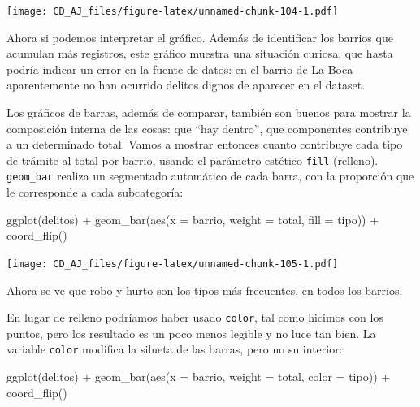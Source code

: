 \documentclass[
]{book}
\newenvironment{Shaded}{\begin{snugshade}}{\end{snugshade}}
\newcommand{\AttributeTok}[1]{\textcolor[rgb]{0.77,0.63,0.00}{#1}}
\newcommand{\FunctionTok}[1]{\textcolor[rgb]{0.00,0.00,0.00}{#1}}
\newcommand{\NormalTok}[1]{#1}
\newcommand{\SpecialCharTok}[1]{\textcolor[rgb]{0.00,0.00,0.00}{#1}}
\begin{document}
\texttt{[image: CD\_AJ\_files/figure-latex/unnamed-chunk-104-1.pdf]}

Ahora si podemos interpretar el gráfico. Además de identificar los barrios que acumulan más registros, este gráfico muestra una situación curiosa, que hasta podría indicar un error en la fuente de datos: en el barrio de La Boca aparentemente no han ocurrido delitos dignos de aparecer en el dataset.

Los gráficos de barras, además de comparar, también son buenos para mostrar la composición interna de las cosas: que ``hay dentro'', que componentes contribuye a un determinado total. Vamos a mostrar entonces cuanto contribuye cada tipo de trámite al total por barrio, usando el parámetro estético \texttt{fill} (relleno). \texttt{geom\_bar} realiza un segmentado automático de cada barra, con la proporción que le corresponde a cada subcategoría:

\begin{Shaded}
\begin{Highlighting}[]
\FunctionTok{ggplot}\NormalTok{(delitos) }\SpecialCharTok{+}
    \FunctionTok{geom\_bar}\NormalTok{(}\FunctionTok{aes}\NormalTok{(}\AttributeTok{x =}\NormalTok{ barrio, }\AttributeTok{weight =}\NormalTok{ total, }\AttributeTok{fill =}\NormalTok{ tipo)) }\SpecialCharTok{+}
    \FunctionTok{coord\_flip}\NormalTok{()}
\end{Highlighting}
\end{Shaded}

\texttt{[image: CD\_AJ\_files/figure-latex/unnamed-chunk-105-1.pdf]}

Ahora se ve que robo y hurto son los tipos más frecuentes, en todos los barrios.

En lugar de relleno podríamos haber usado \texttt{color}, tal como hicimos con los puntos, pero los resultado es un poco menos legible y no luce tan bien. La variable \texttt{color} modifica la silueta de las barras, pero no su interior:

\begin{Shaded}
\begin{Highlighting}[]
\FunctionTok{ggplot}\NormalTok{(delitos) }\SpecialCharTok{+}
    \FunctionTok{geom\_bar}\NormalTok{(}\FunctionTok{aes}\NormalTok{(}\AttributeTok{x =}\NormalTok{ barrio, }\AttributeTok{weight =}\NormalTok{ total, }\AttributeTok{color =}\NormalTok{ tipo)) }\SpecialCharTok{+}
    \FunctionTok{coord\_flip}\NormalTok{()}
\end{Highlighting}
\end{Shaded}
\end{document}
